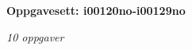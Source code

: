 \centerline{\bf Oppgavesett: i00120no-i00129no}
\vskip 10pt
\centerline{\it 10 oppgaver}\vskip 10pt
\vskip 10pt
